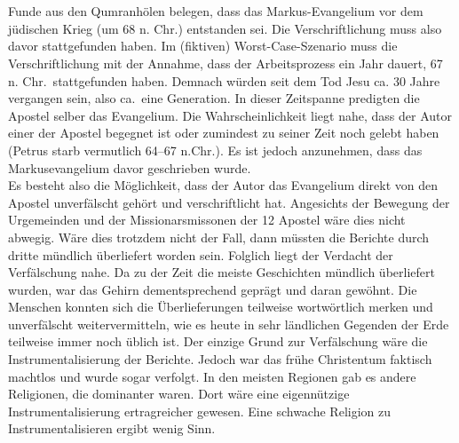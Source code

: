 \\~\\
Funde aus den Qumranhölen belegen, dass das Markus-Evangelium vor dem jüdischen Krieg (um 68 n. Chr.) entstanden sei. Die Verschriftlichung muss also davor stattgefunden haben. Im (fiktiven) Worst-Case-Szenario muss die Verschriftlichung mit der Annahme, dass der Arbeitsprozess ein Jahr dauert, 67 n. Chr.\ stattgefunden haben. Demnach würden seit dem Tod Jesu ca. 30 Jahre vergangen sein, also ca.\ eine Generation. In dieser Zeitspanne predigten die Apostel selber das Evangelium. Die Wahrscheinlichkeit liegt nahe, dass der Autor einer der Apostel begegnet ist oder zumindest zu seiner Zeit noch gelebt haben (Petrus starb vermutlich 64--67 n.Chr.). Es ist jedoch anzunehmen, dass das Markusevangelium davor geschrieben wurde.
\\
Es besteht also die Möglichkeit, dass der Autor das Evangelium direkt von den Apostel unverfälscht gehört und verschriftlicht hat. Angesichts der Bewegung der Urgemeinden und der Missionarsmissonen der 12 Apostel wäre dies nicht abwegig. Wäre dies trotzdem nicht der Fall, dann müssten die Berichte durch dritte mündlich überliefert worden sein. Folglich liegt der Verdacht der Verfälschung nahe. Da zu der Zeit die meiste Geschichten mündlich überliefert wurden, war das Gehirn dementsprechend geprägt und daran gewöhnt. Die Menschen konnten sich die Überlieferungen teilweise wortwörtlich merken und unverfälscht weitervermitteln, wie es heute in sehr ländlichen Gegenden der Erde teilweise immer noch üblich ist. Der einzige Grund zur Verfälschung wäre die Instrumentalisierung der Berichte. Jedoch war das frühe Christentum faktisch machtlos und wurde sogar verfolgt. In den meisten Regionen gab es andere Religionen, die dominanter waren. Dort wäre eine eigennützige Instrumentalisierung ertragreicher gewesen. Eine schwache Religion zu Instrumentalisieren ergibt wenig Sinn.

